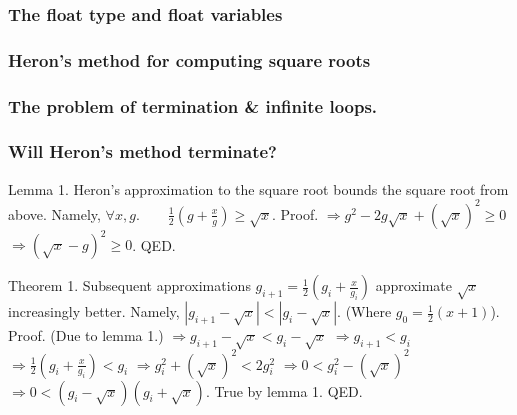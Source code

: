 \documentclass{beamer} %
\begin{document}
\begin{frame}
\frametitle{The float type and float variables}
\end{frame}


\begin{frame}
\frametitle{Heron's method for computing square roots}
\end{frame}


\begin{frame}
\frametitle{The problem of termination \& infinite loops.}
\end{frame}

\begin{frame}
\frametitle{Will Heron's method terminate?}

Lemma 1. Heron's approximation to the square root bounds the square root from above. Namely, $\forall x, g. \qquad \frac{1}{2}(g + \frac{x}{g}) \geq \sqrt{x}$.
Proof. $\Rightarrow g^2 - 2g\sqrt{x}+(\sqrt{x})^2 \geq 0$ 
$\Rightarrow (\sqrt{x} - g)^2 \geq 0$. QED.

Theorem 1. Subsequent approximations $g_{i+1} = \frac{1}{2} (g_i + \frac{x}{g_i})$ approximate $\sqrt{x}$ increasingly better. Namely, $|g_{i+1} - \sqrt{x}| < |g_{i} - \sqrt{x}|$. (Where $g_0 = \frac{1}{2}(x + 1)$).
Proof. (Due to lemma 1.) 
$\Rightarrow g_{i+1} - \sqrt{x} < g_{i} - \sqrt{x}$
$\Rightarrow g_{i+1} < g_{i}$
$\Rightarrow \frac{1}{2} (g_i + \frac{x}{g_i}) < g_{i}$
$\Rightarrow g_i^2 + (\sqrt{x})^2 < 2g_i^2$
$\Rightarrow 0 < g_i^2 - (\sqrt{x})^2$
$\Rightarrow 0 < (g_i - \sqrt{x})(g_i + \sqrt{x})$. True by lemma 1. QED.
\end{frame}

\end{document}
